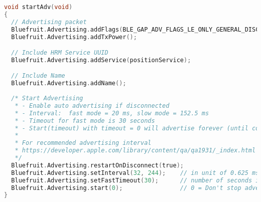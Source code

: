 \begin{lstlisting}[float,language=C,caption=Tập lệnh khởi tạo và kết nối Bluetooth từ thư viện của AdaFruit, label=arduinoBLE,captionpos=b]
void startAdv(void)
{
  // Advertising packet
  Bluefruit.Advertising.addFlags(BLE_GAP_ADV_FLAGS_LE_ONLY_GENERAL_DISC_MODE);
  Bluefruit.Advertising.addTxPower();

  // Include HRM Service UUID
  Bluefruit.Advertising.addService(positionService);

  // Include Name
  Bluefruit.Advertising.addName();
  
  /* Start Advertising
   * - Enable auto advertising if disconnected
   * - Interval:  fast mode = 20 ms, slow mode = 152.5 ms
   * - Timeout for fast mode is 30 seconds
   * - Start(timeout) with timeout = 0 will advertise forever (until connected)
   * 
   * For recommended advertising interval
   * https://developer.apple.com/library/content/qa/qa1931/_index.html   
   */
  Bluefruit.Advertising.restartOnDisconnect(true);
  Bluefruit.Advertising.setInterval(32, 244);    // in unit of 0.625 ms
  Bluefruit.Advertising.setFastTimeout(30);      // number of seconds in fast mode
  Bluefruit.Advertising.start(0);                // 0 = Don't stop advertising after n seconds  
}
\end{lstlisting}
